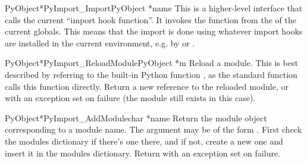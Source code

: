 \begin{cfuncdesc}{PyObject*}{PyImport_Import}{PyObject *name}
  This is a higher-level interface that calls the current ``import
  hook function''.  It invokes the  function
  from the  of the current globals.  This means
  that the import is done using whatever import hooks are installed in
  the current environment, e.g. by 
  or .
\end{cfuncdesc}

\begin{cfuncdesc}{PyObject*}{PyImport_ReloadModule}{PyObject *m}
  Reload a module.  This is best described by referring to the
  built-in Python function , as
  the standard  function calls this function
  directly.  Return a new reference to the reloaded module, or \NULL{}
  with an exception set on failure (the module still exists in this
  case).
\end{cfuncdesc}

\begin{cfuncdesc}{PyObject*}{PyImport_AddModule}{char *name}
  Return the module object corresponding to a module name.  The
   argument may be of the form .
  First check the modules dictionary if there's one there, and if not,
  create a new one and insert it in the modules dictionary.
  Return \NULL{} with an exception set on failure.
\end{cfuncdesc}

